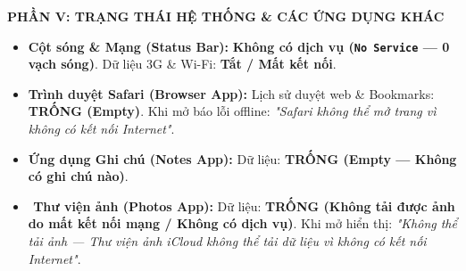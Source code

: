 \documentclass[12pt,a4paper]{article}
\begin{document}
\vspace{0.35cm}\noindent\textbf{\large  PHẦN V: TRẠNG THÁI HỆ THỐNG \& CÁC ỨNG DỤNG KHÁC}\\[0.15cm]


\begin{itemize}[leftmargin=*, itemsep=2pt, topsep=2pt, parsep=0pt]
  \item \textbf{ Cột sóng \& Mạng (Status Bar):} \textbf{Không có dịch vụ (\texttt{No Service} — 0 vạch sóng)}. Dữ liệu 3G \& Wi-Fi: \textbf{Tắt / Mất kết nối}.
  \item \textbf{ Trình duyệt Safari (Browser App):} Lịch sử duyệt web \& Bookmarks: \textbf{TRỐNG (Empty)}. Khi mở báo lỗi offline: \textit{"Safari không thể mở trang vì không có kết nối Internet"}.
  \item \textbf{ Ứng dụng Ghi chú (Notes App):} Dữ liệu: \textbf{TRỐNG (Empty — Không có ghi chú nào)}.
  \item \textbf{️ Thư viện ảnh (Photos App):} Dữ liệu: \textbf{TRỐNG (Không tải được ảnh do mất kết nối mạng / Không có dịch vụ)}. Khi mở hiển thị: \textit{"Không thể tải ảnh — Thư viện ảnh iCloud không thể tải dữ liệu vì không có kết nối Internet"}.
\end{itemize}
\end{document}
